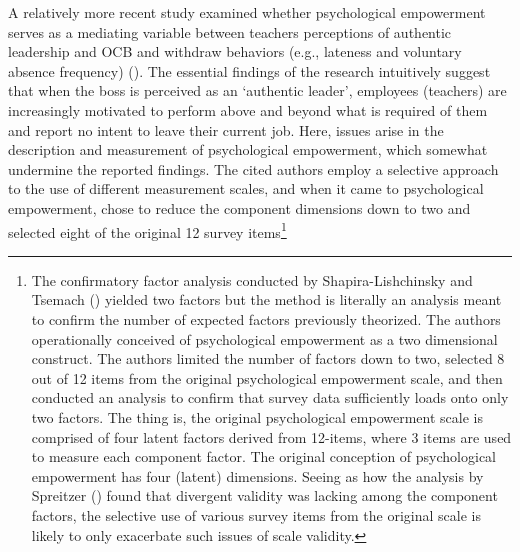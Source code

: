 \documentclass[
  11pt,
  a4paper,
]{article}
\begin{document}
A relatively more recent study examined whether psychological
empowerment serves as a mediating variable between teachers perceptions
of authentic leadership and OCB and withdraw behaviors (e.g., lateness
and voluntary absence frequency)
(). The essential findings of the research intuitively suggest that
when the boss is perceived as an `authentic leader', employees
(teachers) are increasingly motivated to perform above and beyond what
is required of them and report no intent to leave their current job.
Here, issues arise in the description and measurement of psychological
empowerment, which somewhat undermine the reported findings. The cited
authors employ a selective approach to the use of different measurement
scales, and when it came to psychological empowerment, chose to reduce
the component dimensions down to two and selected eight of the original
12 survey items\footnote{The confirmatory factor analysis conducted by
  Shapira-Lishchinsky and Tsemach
  () yielded two factors but
  the method is literally an analysis meant to confirm the number of
  expected factors previously theorized. The authors operationally
  conceived of psychological empowerment as a two dimensional construct.
  The authors limited the number of factors down to two, selected 8 out
  of 12 items from the original psychological empowerment scale, and
  then conducted an analysis to confirm that survey data sufficiently
  loads onto only two factors. The thing is, the original psychological
  empowerment scale is comprised of four latent factors derived from
  12-items, where 3 items are used to measure each component factor. The
  original conception of psychological empowerment has four (latent)
  dimensions. Seeing as how the analysis by Spreitzer
  () found that divergent validity was
  lacking among the component factors, the selective use of various
  survey items from the original scale is likely to only exacerbate such
  issues of scale validity.}
\end{document}
